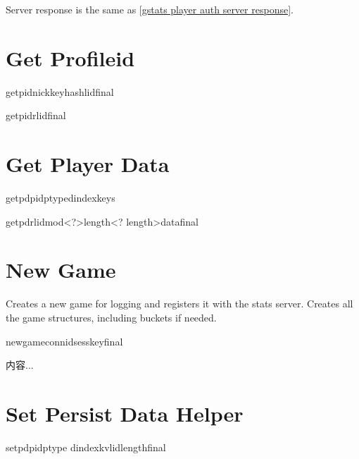\documentclass[oneside,titlepage,a4paper]{Definition/retrospy} %
\begin{document}
Server response is the same as \ref{gstats player auth server response}.

\section{Get Profileid}

\ClientRequest
\begin{mybox}
	\tbs getpid\tbs\tbs nick\tbs <nick name>\tbs keyhash\tbs<cd key hash>\tbs lid\tbs <local id>\tbs final\tbs
\end{mybox}

\ServerResponse

\begin{mybox}
	\tbs getpidr\tbs <profile id>\tbs lid\tbs<local id>\tbs final\tbs
\end{mybox}

\section{Get Player Data}
\ClientRequest
\begin{mybox}
	\tbs getpd\tbs pid\tbs<profile id>\tbs ptype\tbs<persist storage type>\tbs dindex\tbs <data index>\tbs keys
\end{mybox}
\ServerResponse

\begin{mybox}
\tbs getpdr\tbs lid\tbs mod\tbs<?>\tbs length\tbs<? length>\tbs data\tbs final\tbs
\end{mybox}

\section{New Game}
Creates a new game for logging and registers it with the stats server. 
Creates all the game structures, including buckets if needed.
\ClientRequest

\begin{mybox}
	\tbs newgame\tbs\tbs connid\tbs<connection id>\tbs sesskey\tbs<session key>\tbs final\tbs
\end{mybox}

\ServerResponse

\begin{mybox}
	内容...
\end{mybox}

\section{Set Persist Data Helper}
\ClientRequest
\begin{mybox}
	\tbs setpd\tbs pid\tbs<profile id>\tbs ptype\tbs <persist storage type> \tbs dindex\tbs<data index>\tbs kv\tbs<player key value data>\tbs lid\tbs <local id>\tbs length\tbs<size of game defined data>\tbs final\tbs
\end{mybox}
\ServerResponse
\end{document}
